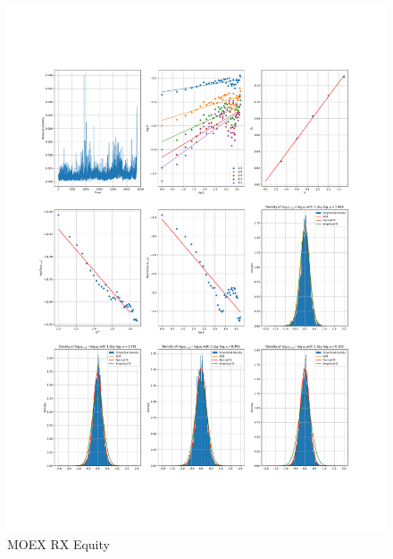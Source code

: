     \begin{figure}[h]
        \includegraphics[width=\textwidth]{fig/MOEX RX Equity.pdf}
        \caption{MOEX RX Equity}
    \end{figure} 
        
